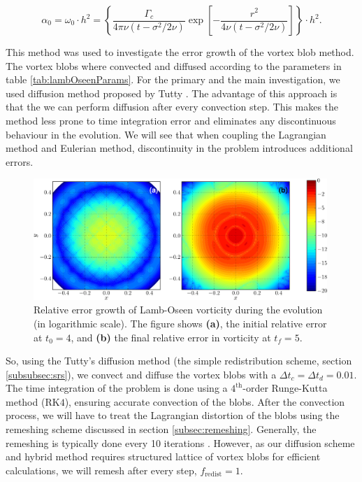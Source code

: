 	\begin{equation}
	\alpha_0 = \omega_0\cdot h^2 = \left\{ \frac{\Gamma_c}{4\pi\nu\left(t-\sigma^2/2\nu\right)} \exp\left[-\frac{r^2}{4\nu\left(t-\sigma^2/2\nu\right)}\right] \right\} \cdot h^2.
\end{equation}
	
This method was used to investigate the error growth of the vortex blob method. The vortex blobs where convected and diffused according to the parameters in table \ref{tab:lambOseenParams}. For the primary and the main investigation, we used diffusion method proposed by Tutty \cite{Tutty2010a}. The advantage of this approach is that the we can perform diffusion after every convection step. This makes the method less prone to time integration error and eliminates any discontinuous behaviour in the evolution. We will see that when coupling the Lagrangian method and Eulerian method, discontinuity in the problem introduces additional errors.

	\begin{figure}[!t]
	\centering
	\includegraphics[width=0.99\textwidth]{figures/lagrangian/lambOseen_convection_vorticityErrorContours_compressed-crop.pdf}
	\caption{Relative error growth of Lamb-Oseen vorticity during the evolution (in logarithmic scale). The figure shows \textbf{(a)}, the initial relative error at $t_0=4$, and \textbf{(b)} the final relative error in vorticity at $t_f=5$.}
	\label{fig:lambOseen_convection_vorticityErrorContours_compressed}
	\end{figure}

So, using the Tutty's diffusion method (the simple redistribution scheme, section \ref{subsubsec:srs}), we convect and diffuse the vortex blobs with a $\Delta t_c=\Delta t_d = 0.01$. The time integration of the problem is done using a $4^{\mathrm{th}}$-order Runge-Kutta method ($\mathrm{RK4}$), ensuring accurate convection of the blobs. After the convection process, we will have to treat the Lagrangian distortion of the blobs using the remeshing scheme discussed in section \ref{subsec:remeshing}. Generally, the remeshing is typically done every 10 iterations \cite{Barba2004c}. However, as our diffusion scheme and hybrid method requires structured lattice of vortex blobs for efficient calculations, we will remesh after every step, $f_{\mathrm{redist}}=1$.  

